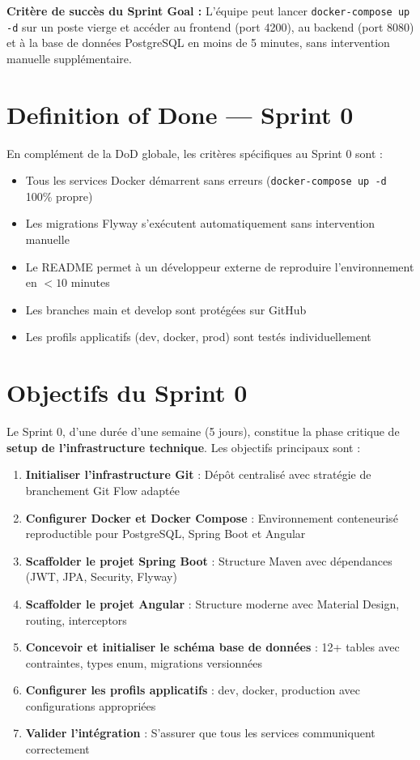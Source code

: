 \documentclass[12pt,a4paper]{report}
\begin{document}
\textbf{Critère de succès du Sprint Goal :} L'équipe peut lancer \texttt{docker-compose up -d} sur un poste vierge et accéder au frontend (port 4200), au backend (port 8080) et à la base de données PostgreSQL en moins de 5 minutes, sans intervention manuelle supplémentaire.

\section{Definition of Done — Sprint 0}

En complément de la DoD globale, les critères spécifiques au Sprint 0 sont :

\begin{itemize}[itemsep=0.4em]
    \item  Tous les services Docker démarrent sans erreurs (\texttt{docker-compose up -d} 100\% propre)
    \item  Les migrations Flyway s'exécutent automatiquement sans intervention manuelle
    \item  Le README permet à un développeur externe de reproduire l'environnement en $< 10$ minutes
    \item  Les branches main et develop sont protégées sur GitHub
    \item  Les profils applicatifs (dev, docker, prod) sont testés individuellement
\end{itemize}

\section{Objectifs du Sprint 0}

Le Sprint 0, d'une durée d'une semaine (5 jours), constitue la phase critique de \textbf{setup de l'infrastructure technique}. Les objectifs principaux sont :

\begin{enumerate}[itemsep=0.5em]
    \item \textbf{Initialiser l'infrastructure Git} : Dépôt centralisé avec stratégie de branchement Git Flow adaptée
    \item \textbf{Configurer Docker et Docker Compose} : Environnement conteneurisé reproductible pour PostgreSQL, Spring Boot et Angular
    \item \textbf{Scaffolder le projet Spring Boot} : Structure Maven avec dépendances (JWT, JPA, Security, Flyway)
    \item \textbf{Scaffolder le projet Angular} : Structure moderne avec Material Design, routing, interceptors
    \item \textbf{Concevoir et initialiser le schéma base de données} : 12+ tables avec contraintes, types enum, migrations versionnées
    \item \textbf{Configurer les profils applicatifs} : dev, docker, production avec configurations appropriées
    \item \textbf{Valider l'intégration} : S'assurer que tous les services communiquent correctement
\end{enumerate}
\end{document}
